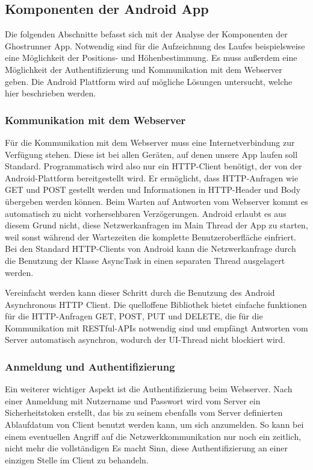 \subsection{Komponenten der Android App}
Die folgenden Abschnitte befasst sich mit der Analyse der Komponenten der Ghostrunner App. Notwendig sind für die Aufzeichnung des Laufes beispielsweise eine Möglichkeit der Positions- und Höhenbestimmung. Es muss außerdem eine Möglichkeit der Authentifizierung und Kommunikation mit dem Webserver geben. Die Android Plattform wird auf mögliche Lösungen untersucht, welche hier beschrieben werden.
\subsubsection{Kommunikation mit dem Webserver}
Für die Kommunikation mit dem Webserver muss eine Internetverbindung zur Verfügung stehen. Diese ist bei allen Geräten, auf denen unsere App laufen soll Standard. Programmatisch wird also nur ein HTTP-Client benötigt, der von der Android-Plattform bereitgestellt wird. Er ermöglicht, dass  HTTP-Anfragen wie GET und POST gestellt werden und Informationen in HTTP-Header und Body übergeben werden können. Beim Warten auf Antworten vom Webserver kommt es automatisch zu nicht vorhersehbaren Verzögerungen. Android erlaubt es aus diesem Grund nicht, diese Netzwerkanfragen im Main Thread der App zu starten, weil sonst während der Wartezeiten die komplette Benutzeroberfläche einfriert. Bei den Standard HTTP-Clients von Android kann die Netzwerkanfrage durch die Benutzung der Klasse AsyncTask in einen separaten Thread ausgelagert werden. \cite{androidnetwork}

Vereinfacht werden kann dieser Schritt durch die Benutzung des Android Asynchronous HTTP Client. Die quelloffene Bibliothek bietet einfache funktionen für die HTTP-Anfragen GET, POST, PUT und DELETE, die für die Kommunikation mit RESTful-APIs notwendig sind und empfängt Antworten vom Server automatisch asynchron, wodurch der UI-Thread nicht blockiert wird. \cite{loopj}
\subsubsection{Anmeldung und Authentifizierung}
Ein weiterer wichtiger Aspekt ist die Authentifizierung beim Webserver. Nach einer Anmeldung mit Nutzername und Passwort wird vom Server ein Sicherheitstoken erstellt, das bis zu seinem ebenfalls vom Server definierten Ablaufdatum von Client benutzt werden kann, um sich anzumelden. So kann bei einem eventuellen Angriff auf die Netzwerkkommunikation nur noch ein zeitlich, nicht mehr die vollständigen
Es macht Sinn, diese Authentifizierung an einer einzigen Stelle im Client zu behandeln.
